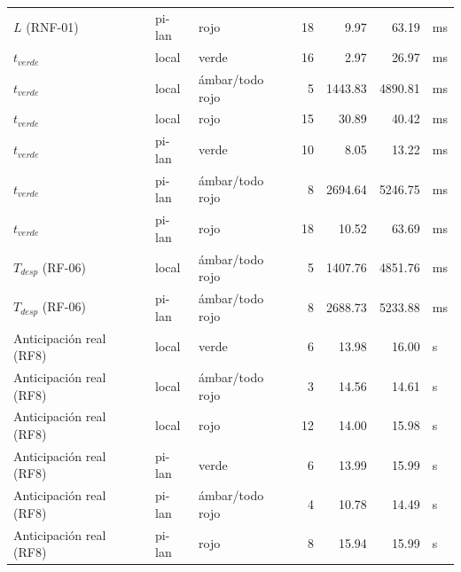 \begin{table}[H]
\begin{tabular}{lllrrrl}
$L$ (RNF-01) & pi-lan & rojo & 18 & 9.97 & 63.19 & ms \\
$t_{verde}$ & local & verde & 16 & 2.97 & 26.97 & ms \\
$t_{verde}$ & local & ámbar/todo rojo & 5 & 1443.83 & 4890.81 & ms \\
$t_{verde}$ & local & rojo & 15 & 30.89 & 40.42 & ms \\
$t_{verde}$ & pi-lan & verde & 10 & 8.05 & 13.22 & ms \\
$t_{verde}$ & pi-lan & ámbar/todo rojo & 8 & 2694.64 & 5246.75 & ms \\
$t_{verde}$ & pi-lan & rojo & 18 & 10.52 & 63.69 & ms \\
$T_{desp}$ (RF-06) & local & ámbar/todo rojo & 5 & 1407.76 & 4851.76 & ms \\
$T_{desp}$ (RF-06) & pi-lan & ámbar/todo rojo & 8 & 2688.73 & 5233.88 & ms \\
Anticipación real (RF8) & local & verde & 6 & 13.98 & 16.00 & s \\
Anticipación real (RF8) & local & ámbar/todo rojo & 3 & 14.56 & 14.61 & s \\
Anticipación real (RF8) & local & rojo & 12 & 14.00 & 15.98 & s \\
Anticipación real (RF8) & pi-lan & verde & 6 & 13.99 & 15.99 & s \\
Anticipación real (RF8) & pi-lan & ámbar/todo rojo & 4 & 10.78 & 14.49 & s \\
Anticipación real (RF8) & pi-lan & rojo & 8 & 15.94 & 15.99 & s \\
\bottomrule
\end{tabular}
\end{table}
